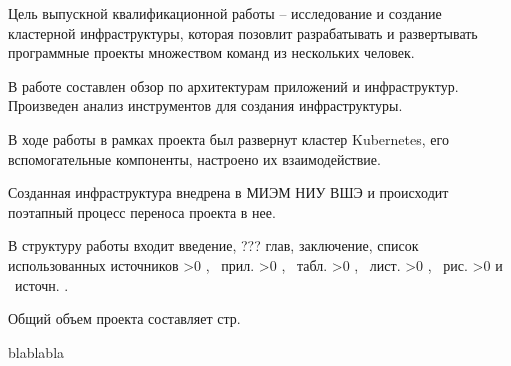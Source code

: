 \Abstract
Цель выпускной квалификационной работы -- исследование и создание кластерной инфраструктуры, которая позовлит разрабатывать и развертывать программные проекты множеством команд из нескольких человек.

В работе составлен обзор по архитектурам приложений и инфраструктур. Произведен анализ инструментов для создания инфраструктуры.

В ходе работы в рамках проекта был развернут кластер Kubernetes, его вспомогательные компоненты, настроено их взаимодействие.

Созданная инфраструктура внедрена в МИЭМ НИУ ВШЭ и происходит поэтапный процесс переноса проекта в нее.

В структуру работы входит введение, ??? глав, заключение, список использованных источников
\ifnum \totapp >0
, \totapp\ прил.
\fi
\ifnum \tottab >0
, \tottab\ табл.
\fi
\ifnum \totlst >0
, \totlst\ лист.
\fi
\ifnum \totfig >0
, \totfig\ рис.
\fi
\ifnum \totbib >0
и \totbib\ источн.
\else
.
\fi

Общий объем проекта составляет \pageref{LastPage} стр.

\AbstractEn

blablabla
